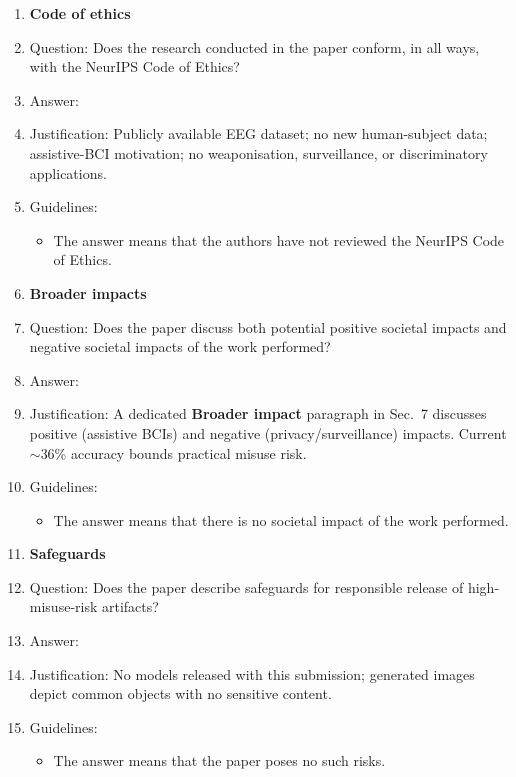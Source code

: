 \documentclass{article}
\begin{document}
\begin{enumerate}
\item {\bf Code of ethics}
    \item[] Question: Does the research conducted in the paper conform, in all ways, with the NeurIPS Code of Ethics?
    \item[] Answer: \answerYes{}
    \item[] Justification: Publicly available EEG dataset; no new human-subject data; assistive-BCI motivation; no weaponisation, surveillance, or discriminatory applications.
    \item[] Guidelines:
    \begin{itemize}
        \item The answer \answerNA{} means that the authors have not reviewed the NeurIPS Code of Ethics.
    \end{itemize}

\item {\bf Broader impacts}
    \item[] Question: Does the paper discuss both potential positive societal impacts and negative societal impacts of the work performed?
    \item[] Answer: \answerYes{}
    \item[] Justification: A dedicated \textbf{Broader impact} paragraph in Sec.~7 discusses positive (assistive BCIs) and negative (privacy/surveillance) impacts. Current $\sim$36\% accuracy bounds practical misuse risk.
    \item[] Guidelines:
    \begin{itemize}
        \item The answer \answerNA{} means that there is no societal impact of the work performed.
    \end{itemize}

\item {\bf Safeguards}
    \item[] Question: Does the paper describe safeguards for responsible release of high-misuse-risk artifacts?
    \item[] Answer: \answerNA{}
    \item[] Justification: No models released with this submission; generated images depict common objects with no sensitive content.
    \item[] Guidelines:
    \begin{itemize}
        \item The answer \answerNA{} means that the paper poses no such risks.
    \end{itemize}


\end{enumerate}
\end{document}
